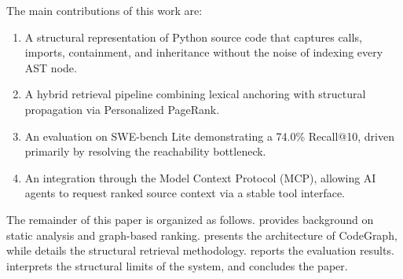 The main contributions of this work are:
\begin{enumerate}
    \item A structural representation of Python source code that captures calls, imports, containment, and inheritance without the noise of indexing every AST node.
    \item A hybrid retrieval pipeline combining lexical anchoring with structural propagation via Personalized PageRank.
    \item An evaluation on SWE-bench Lite demonstrating a 74.0\% Recall@10, driven primarily by resolving the reachability bottleneck.
    \item An integration through the Model Context Protocol (MCP), allowing AI agents to request ranked source context via a stable tool interface.
\end{enumerate}

The remainder of this paper is organized as follows.  provides background on static analysis and graph-based ranking.  presents the architecture of CodeGraph, while  details the structural retrieval methodology.  reports the evaluation results.  interprets the structural limits of the system, and  concludes the paper.

